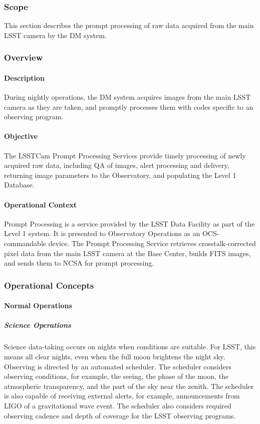 \subsubsection{Scope}
This section describes the prompt processing of raw data acquired from the main
LSST camera by the DM system.

\subsubsection{Overview}

\paragraph{Description}
During nightly operations, the DM system acquires images from the main LSST
camera as they are taken, and promptly processes them with codes specific to an
observing program.

\paragraph{Objective}
The LSSTCam Prompt Processing Services provide timely processing of newly
acquired raw data, including QA of images, alert processing and delivery,
returning image parameters to the Observatory, and populating the Level 1
Database.

\paragraph{Operational Context}
Prompt Processing is a service provided by the LSST Data Facility as part of the
Level 1 system. It is presented to Observatory Operations as an OCS-commandable
device. The Prompt Processing Service retrieves crosstalk-corrected pixel data
from the main LSST camera at the Base Center, builds FITS images, and sends them
to NCSA for prompt processing.

\subsubsection{Operational Concepts}

\paragraph{Normal Operations}

\subparagraph{Science Operations}

Science data-taking occurs on nights when conditions are suitable. For
LSST, this means all clear nights, even when the full moon brightens
the night sky. Observing is directed by an automated scheduler. The
scheduler considers observing conditions, for example, the seeing, the
phase of the moon, the atmospheric transparency, and the part of the
sky near the zenith. The scheduler is also capable of receiving
external alerts, for example, announcements from LIGO of a
gravitational wave event. The scheduler also considers required
observing cadence and depth of coverage for the LSST observing
programs.

